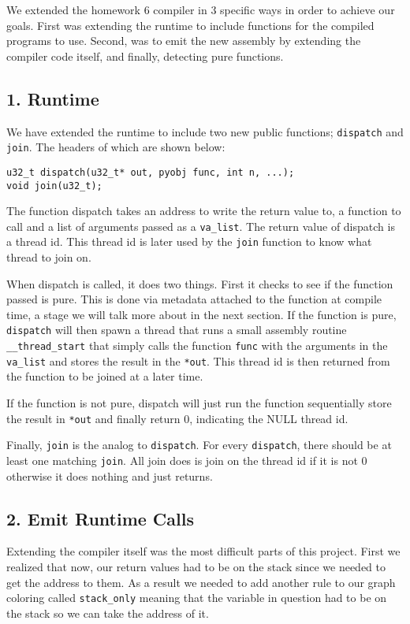 \documentclass{acm_proc_article-sp}
\begin{document}
We extended the homework 6 compiler in 3 specific ways in order to achieve our
goals. First was extending the runtime to include functions for the compiled
programs to use. Second, was to emit the new assembly by extending the compiler
code itself, and finally, detecting pure functions.

\subsection*{1. Runtime}
We have extended the runtime to include two new public functions; \verb|dispatch| and
\verb|join|. The headers of which are shown below:

\begin{verbatim}
u32_t dispatch(u32_t* out, pyobj func, int n, ...);
void join(u32_t);
\end{verbatim}

The function dispatch takes an address to write the return value to, a function
to call and a list of arguments passed as a \verb|va_list|. The return value of
dispatch is a thread id. This thread id is later used by the \verb|join| function
to know what thread to join on.

When dispatch is called, it does two things. First it checks to see if the
function passed is pure. This is done via metadata attached to the function at
compile time, a stage we will talk more about in the next section. If the
function is pure, \verb|dispatch| will then spawn a thread that runs a small
assembly routine \verb|__thread_start| that simply calls the function
\verb|func| with the arguments in the \verb|va_list| and stores the result in
the \verb|*out|. This thread id is then returned from the function to be joined
at a later time.

If the function is not pure, dispatch will just run the function sequentially
store the result in \verb|*out| and finally return 0, indicating the NULL
thread id.

Finally, \verb|join| is the analog to \verb|dispatch|. For every \verb|dispatch|,
there should be at least one matching \verb|join|. All join does is join on the thread
id if it is not 0 otherwise it does nothing and just returns.

\subsection*{2. Emit Runtime Calls}

Extending the compiler itself was the most difficult parts of this project.
First we realized that now, our return values had to be on the stack since
we needed to get the address to them. As a result we needed to add another rule
to our graph coloring called \verb|stack_only| meaning that the variable in
question had to be on the stack so we can take the address of it.
\end{document}
